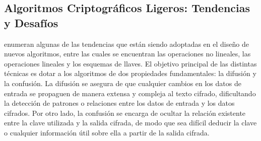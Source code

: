 \documentclass[a4paper,10pt]{article}
\begin{document}
	\subsection{Algoritmos Criptográficos Ligeros: Tendencias y Desafíos}
	\label{sec.2.1}
	\textcite{biryukov2017state} enumeran algunas de las tendencias que están siendo adoptadas en el diseño de nuevos algoritmos, entre las cuales se encuentran las operaciones no lineales, las operaciones lineales y los esquemas de llaves. El objetivo principal de las distintas técnicas es dotar a los algoritmos de dos propiedades fundamentales: la difusión y la confusión. La difusión se asegura de que cualquier cambios en los datos de entrada se propaguen de manera extensa y compleja al texto cifrado, dificultando la detección de patrones o relaciones entre los datos de entrada y los datos cifrados. Por otro lado, la confusión se encarga de ocultar la relación existente entre la clave utilizada y la salida cifrada, de modo que sea difícil deducir la clave o cualquier información útil sobre ella a partir de la salida cifrada.
\end{document}
